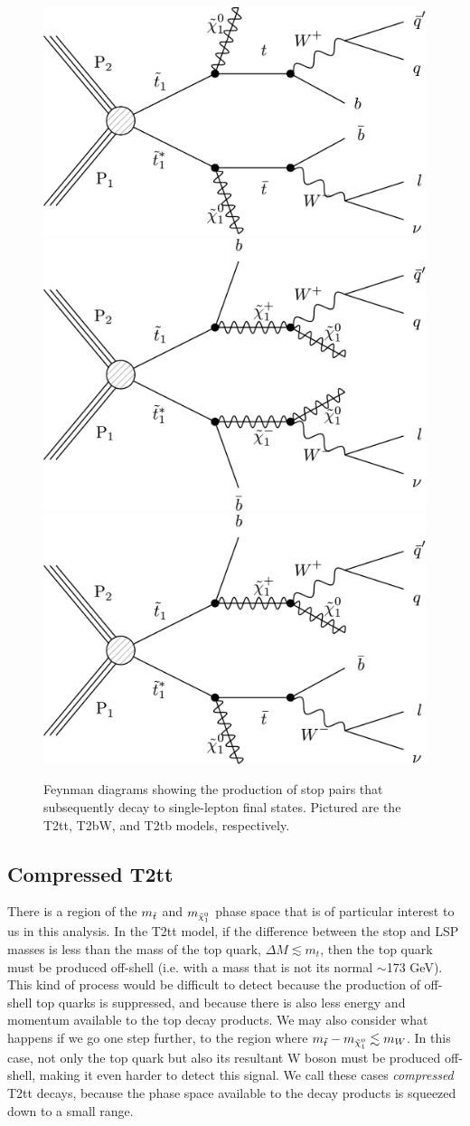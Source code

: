 \begin{figure}[htb]
\centering
\includegraphics[width=0.45\linewidth]{figures/feynmandiagram_T2tt.pdf}
\includegraphics[width=0.45\linewidth]{figures/feynmandiagram_T2bW.pdf}
\includegraphics[width=0.45\linewidth]{figures/feynmandiagram_T2tb.pdf}
\caption{Feynman diagrams showing the production of stop pairs that
  subsequently decay to single-lepton final states. Pictured are the
  T2tt, T2bW, and T2tb models, respectively.}
\label{fig:stop:feynmandiagrams}
\end{figure}

\subsection{Compressed T2tt}
\label{ssec:stop:sigcompressed}

There is a region of the $m_{\tilde{t}}$ and $m_{\tilde{\chi}^0_1}$ phase space
that is of particular interest to us in this analysis. In the T2tt
model, if the difference between the stop and LSP masses is less than
the mass of the top quark, $\Delta M \lesssim m_t$, then the top quark
must be produced off-shell (i.e. with a mass that is not its normal
$\sim$173 GeV). This kind of process would be difficult to detect
because the production of off-shell top quarks is suppressed, and
because there is also less energy and momentum available to the top
decay products. We may also consider what happens if we go one step
further, to the region where $m_{\tilde{t}} - m_{\tilde{\chi}^0_1} \lesssim m_W$. In this case, not
only the top quark but also its resultant W boson must be produced
off-shell, making it even harder to detect this signal. We call these
cases \emph{compressed} T2tt decays, because the phase space available to
the decay products is squeezed down to a small range.

